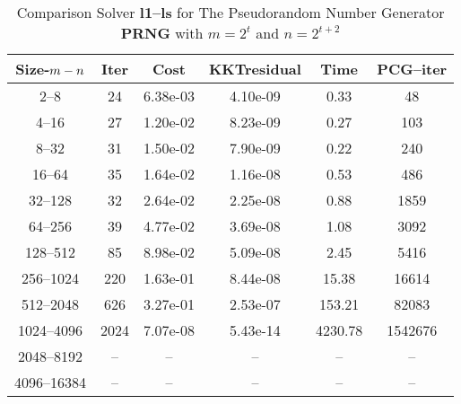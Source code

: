 \begin{table}
\caption{Comparison Solver  {\bf l1--ls} for  The  Pseudorandom Number Generator {\bf PRNG} with $m=2^{t}$ and $n=2^{t+2}$} 
\begin{center}
\begin{tabular}{|*{6}{c}|} \hline
Size-$m\--n$ & \multicolumn{1}{c}{Iter} & \multicolumn{1}{c}{Cost}& \multicolumn{1}{c}{KKTresidual} & \multicolumn{1}{c}{Time} & \multicolumn{1}{c|}{PCG--iter} \\ 
\hline
2--8             &24     &6.38e-03  &4.10e-09  &0.33   &48    \\
4--16            &27     &1.20e-02  &8.23e-09  &0.27   &103   \\
8--32            &31     &1.50e-02  &7.90e-09  &0.22   &240   \\
16--64           &35     &1.64e-02  &1.16e-08  &0.53   &486   \\
32--128          &32     &2.64e-02  &2.25e-08  &0.88   &1859  \\
64--256          &39     &4.77e-02  &3.69e-08  &1.08   &3092  \\
128--512         &85     &8.98e-02  &5.09e-08  &2.45   &5416  \\
256--1024        &220    &1.63e-01  &8.44e-08  &15.38  &16614 \\
512--2048        &626    &3.27e-01  &2.53e-07  &153.21  &82083 \\
1024--4096       &2024   &7.07e-08  &5.43e-14 &4230.78 &1542676\\
2048--8192     &--    &--        &--       &--          &--  \\ 
4096--16384    &--    &--        &--        &--         &-- \\
\hline
\end{tabular}
\end{center}
\end{table}


